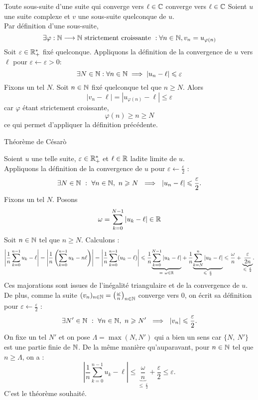 \documentclass{article}
\begin{document}
\begin{question_kholle}{Toute sous-suite d’une suite qui converge vers $\ell\in\mathbb C$ converge vers $\ell\in\mathbb C$}
	Soient $u$ une suite complexe et $v$ une sous-suite quelconque de $u$.\\
	Par définition d’une sous-suite,
	\[
		\exists \varphi:\mathbb N\longrightarrow\mathbb N \text{ strictement croissante }: \forall n\in\mathbb N, v_{n}=u_{\varphi(n)}
	\]
	Soit $\varepsilon\in\mathbb R_{+}^{*}$ fixé quelconque. Appliquons la définition de la convergence de $u$ vers $\ell$ pour $\varepsilon\leftarrow \varepsilon>0$:
	\[
		\exists N\in\mathbb N:\forall n\in\mathbb N \implies |u_{n}-\ell|\leqslant \varepsilon
	\]
	Fixons un tel $N$. Soit $n\in\mathbb N$ fixé quelconque tel que $n\geq N$. Alors
	\[
		|v_{n}-\ell|=|u_{\varphi(n)}-\ell|\leq \varepsilon
	\]
	car $\varphi$ étant strictement croissante,
	\[
		\varphi(n)\geq n \geq N
	\]
	ce qui permet d’appliquer la définition précédente.

\end{question_kholle}

\begin{question_kholle}
	{Théorème de Césarò}

	Soient $u$ une telle suite, $\varepsilon \in \mathbb R ^*_+$ et $\ell \in \mathbb R$ ladite limite de $u$.\\
	Appliquons la définition de la convergence de $u$ pour $\varepsilon \gets \frac{\varepsilon}{2}$ :
	\[
		\exists N \in \mathbb N \ : \ \forall n \in \mathbb N , \ n\geqslant N \ \implies \ |u_n - \ell | \leqslant \frac{\varepsilon}{2}.
	\]
	Fixons un tel $N$. Posons
	\[
		\omega = \sum_{k=0}^{N-1} |u_k - \ell | \in \mathbb R
	\]
	Soit $n\in \mathbb N$ tel que $n \geq N$. Calculons :
	\[
		\left| \frac{1}{n} \sum_{k=0}^{n-1}u_k - \ell \right| = \left| \frac{1}{n} \left( \sum_{k=0}^{n-1}u_k - n\ell \right) \right|  = \left| \frac{1}{n} \sum_{k=0}^{n-1}(u_k - \ell)  \right| \leq \frac{1}{n} \underset{= \ \omega \in \R}{\underbrace{\sum_{k=0}^{N-1}|u_k - \ell|}} + \frac{1}{n} \underset{\leq \ \frac{\varepsilon}{2}}{\underbrace{\sum_{k=N}^{n}|u_k - \ell|}} \leq \frac{\omega}{n} + \underset{\leq \ \frac{\varepsilon}{2}}{\underbrace{\frac{\varepsilon}{2n}}}.
	\]
	Ces majorations sont issues de l'inégalité triangulaire et de la convergence de $u$.\\
	De plus, comme la suite $(v_n) _{n\in \mathbb N} = \left( \frac{\omega}{n} \right) _{n\in \mathbb N}$ converge vers $0$, on écrit sa définition pour $\varepsilon \gets \frac{\varepsilon}{2}$ :
	\[
		\exists N' \in \mathbb N \ : \ \forall n \in \mathbb N , \ n\geqslant N' \ \implies \ |v_n| \leqslant \frac{\varepsilon}{2}.
	\]
	On fixe un tel $N'$ et on pose $\Lambda = \max{(N, N')}$ qui a bien un sens car $\{N, \ N'\}$ est une partie finie de $\mathbb N$.
	De la même manière qu'auparavant, pour $n\in \mathbb N$ tel que $n \geq \Lambda$, on a :
	\[
		\left| \frac{1}{n} \sum_{k=0}^{n-1}u_k - \ell \right| \leq \underset{\leq \ \frac{\varepsilon}{2}}{\underbrace{\frac{\omega}{n}}} + \frac{\varepsilon}{2} \leq \varepsilon.
	\]
	C'est le théorème souhaité.
\end{question_kholle}
\end{document}

